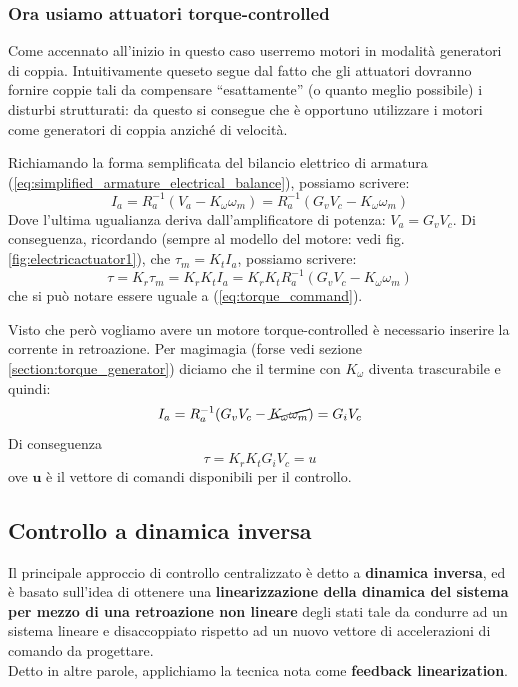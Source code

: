 \subsubsection{Ora usiamo attuatori torque-controlled}
Come accennato all'inizio in questo caso userremo motori in modalità generatori di coppia. Intuitivamente queseto segue dal fatto che gli attuatori dovranno fornire coppie tali da compensare “esattamente” (o quanto meglio possibile) i disturbi strutturati: da questo si consegue che è opportuno utilizzare i motori come generatori di coppia anziché di velocità.

Richiamando la forma semplificata del bilancio elettrico di armatura (\ref{eq:simplified_armature_electrical_balance}), possiamo scrivere:
$$
I_a = R_a^{-1}(V_a - K_\omega \omega_m) = R_a^{-1}(G_vV_c - K_\omega \omega_m)
$$
Dove l'ultima ugualianza deriva dall'amplificatore di potenza: $V_a = G_v V_c$.
Di conseguenza, ricordando (sempre al modello del motore: vedi fig. \ref{fig:electricactuator1}), che $\tau_m = K_t I_a$, possiamo scrivere:
$$
\tau = K_r \tau_m = K_r K_t I_a = K_r K_t R_a^{-1}(G_vV_c - K_\omega \omega_m)
$$
che si può notare essere uguale a (\ref{eq:torque_command}).

Visto che però vogliamo avere un motore torque-controlled è necessario inserire la corrente in retroazione. Per magimagia (forse vedi sezione \ref{section:torque_generator}) diciamo che il termine con $K_\omega$ diventa trascurabile e quindi:
$$
I_a = R_a^{-1}(G_vV_c - \cancel{K_\omega\omega_m}) = G_i V_c
$$
Di conseguenza
\boldmath
$$
\tau = K_r K_t G_i V_c = u
$$
\unboldmath
ove $\mathbf{u}$ è il vettore di comandi disponibili per il controllo.







\vspace*{20pt}
\subsection{Controllo a dinamica inversa}\label{section:joint_space_inverse_dyn_contr}

Il principale approccio di controllo centralizzato è detto a \textbf{dinamica inversa}, ed è basato sull’idea di ottenere una \textbf{linearizzazione della dinamica del sistema per mezzo di una retroazione non lineare} degli stati tale da condurre ad un sistema lineare e disaccoppiato rispetto ad un nuovo vettore di accelerazioni di comando da progettare. \\
Detto in altre parole, applichiamo la tecnica nota come \textbf{feedback linearization}.

